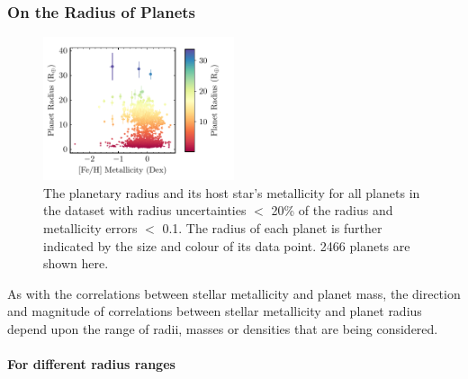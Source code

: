 \documentclass[a4paper,twocolumn,12pt]{article}
\begin{document}




\subsubsection{On the Radius of Planets}

\begin{figure}[h!]
    \centering
    \includegraphics[width=0.5\textwidth]{Graphs/FeH vs Radius Planet Plot.pdf}
    \caption{The planetary radius and its host star's metallicity for all planets in the dataset with radius uncertainties $<$ 20\% of the radius and metallicity errors $<$ 0.1. The radius of each planet is further indicated by the size and colour of its data point. 2466 planets are shown here.}
    \label{figure: Fe/H vs radius parameter plot}
\end{figure}

As with the correlations between stellar metallicity and planet mass, the direction and magnitude of correlations between stellar metallicity and planet radius depend upon the range of radii, masses or densities that are being considered.




\paragraph{For different radius ranges}
\vspace{-0.7em}
\end{document}
